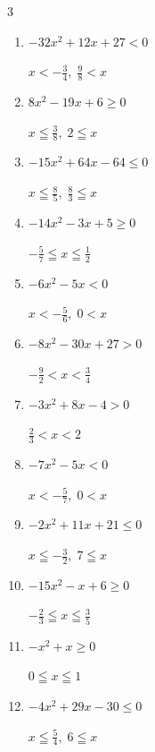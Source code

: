 \begin{multicols}{3}
\begin{enumerate}
        $\displaystyle \frac{1}{4} < x < 1$

  \item $-32x^{2}+12x+27<0$

        $\displaystyle x < -\frac{3}{4} , \; \frac{9}{8} < x$

  \item $8x^{2}-19x+6\geq 0$

        $\displaystyle x \leqq \frac{3}{8} , \; 2 \leqq x$

  \item $-15x^{2}+64x-64\leq 0$

        $\displaystyle x \leqq \frac{8}{5} , \; \frac{8}{3} \leqq x$

  \item $-14x^{2}-3x+5\geq 0$

        $\displaystyle -\frac{5}{7} \leqq x \leqq \frac{1}{2}$

  \item $-6x^{2}-5x<0$

        $\displaystyle x < -\frac{5}{6} , \; 0 < x$

\columnbreak %

  \item $-8x^{2}-30x+27>0$

        $\displaystyle -\frac{9}{2} < x < \frac{3}{4}$

  \item $-3x^{2}+8x-4>0$

        $\displaystyle \frac{2}{3} < x < 2$

  \item $-7x^{2}-5x<0$

        $\displaystyle x < -\frac{5}{7} , \; 0 < x$

  \item $-2x^{2}+11x+21\leq 0$

        $\displaystyle x \leqq -\frac{3}{2} , \; 7 \leqq x$

  \item $-15x^{2}-x+6\geq 0$

        $\displaystyle -\frac{2}{3} \leqq x \leqq \frac{3}{5}$

  \item $-x^{2}+x\geq 0$

        $\displaystyle 0 \leqq x \leqq 1$

  \item $-4x^{2}+29x-30\leq 0$

        $\displaystyle x \leqq \frac{5}{4} , \; 6 \leqq x$


\end{enumerate}
\end{multicols}
